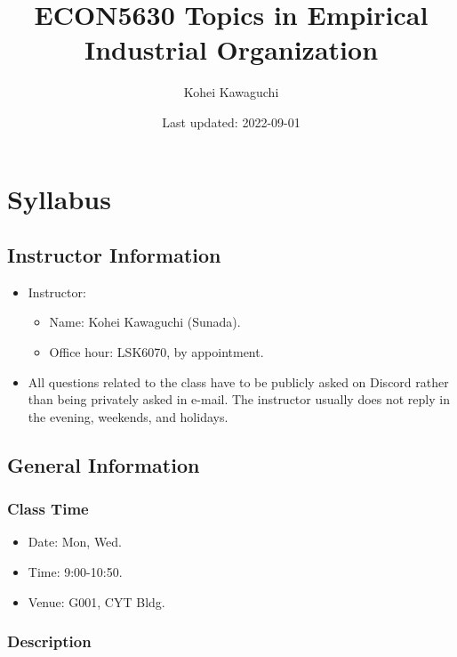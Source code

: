 \documentclass[
]{book}
\title{ECON5630 Topics in Empirical Industrial Organization}
\author{Kohei Kawaguchi}
\date{Last updated: 2022-09-01}
\providecommand{\tightlist}{%
  \setlength{\itemsep}{0pt}\setlength{\parskip}{0pt}}
\begin{document}
\maketitle

{
\setcounter{tocdepth}{1}
\tableofcontents
}
\hypertarget{syllabus}{%
\chapter{Syllabus}\label{syllabus}}

\hypertarget{instructor-information}{%
\section{Instructor Information}\label{instructor-information}}

\begin{itemize}
\tightlist
\item
  Instructor:

  \begin{itemize}
  \tightlist
  \item
    Name: Kohei Kawaguchi (Sunada).
  \item
    Office hour: LSK6070, by appointment.
  \end{itemize}
\item
  All questions related to the class have to be publicly asked on Discord rather than being privately asked in e-mail. The instructor usually does not reply in the evening, weekends, and holidays.
\end{itemize}

\hypertarget{general-information}{%
\section{General Information}\label{general-information}}

\hypertarget{class-time}{%
\subsection{Class Time}\label{class-time}}

\begin{itemize}
\tightlist
\item
  Date: Mon, Wed.
\item
  Time: 9:00-10:50.
\item
  Venue: G001, CYT Bldg.
\end{itemize}

\hypertarget{description}{%
\subsection{Description}\label{description}}
\end{document}
